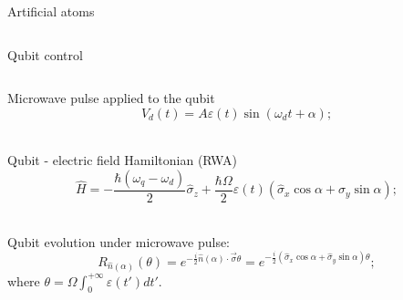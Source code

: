 \documentclass[aspectratio=169,10pt]{beamer}
\begin{document}
\begin{frame}{Artificial atoms}
\begin{columns}
\begin{column}{0.6\textwidth}
    \end{column}
  \end{columns}
\end{frame}

\begin{frame}{Qubit control}

  \begin{columns}
    \begin{column}{0.45\textwidth}
      \small

      Microwave pulse applied to the qubit
      \begin{equation*}
        V_d(t) = A\varepsilon(t)\sin{(\omega_d t + \alpha)};
      \end{equation*}\\
      \vspace{1.5em}

      Qubit - electric field Hamiltonian (RWA)
      \begin{equation*}
        \hat{H} = -\frac{\hbar (\omega_q - \omega_d)}{2} \hat{\sigma}_z + \frac{\hbar \Omega}{2} \varepsilon(t) \left( \hat{\sigma}_x \cos \alpha + \hat{\sigma}_y \sin \alpha \right);
      \end{equation*}\\
      \vspace{1.5em}


      Qubit evolution under microwave pulse:
      \begin{equation*}
        R_{\hat{n}(\alpha)}(\theta) = e^{-\frac{i}{2} \hat{n}(\alpha) \cdot \vec{\sigma} \theta} = e^{-\frac{i}{2} (\hat{\sigma}_x \cos \alpha + \hat{\sigma}_y \sin \alpha) \theta};
      \end{equation*}
      where $\theta = \Omega\int_{0}^{+\infty}\varepsilon(t')dt'$.


\end{column}
\end{columns}
\end{frame}
\end{document}
